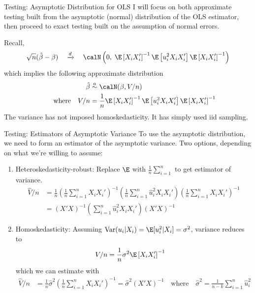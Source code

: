 \documentclass[aspectratio=169, handout]{beamer}
\newcommand{\Var}{\operatorname{Var}}
\newcommand{\dto}{\xrightarrow{d}}
\newcommand{\sumin}{\sum^n_{i=1}}
\begin{document}
\begin{frame}{Testing: Asymptotic Distribution for OLS}
I will focus on both \alert{approximate} testing built from the
\alert{asymptotic} (normal) distribution of the OLS estimator, then
proceed to \alert{exact} testing built on the \alert{assumption} of
normal errors.

Recall,
\begin{align*}
  \sqrt{n}
  (\hat{\beta}-\beta)
  \quad\dto\quad
  \calN\left(
  0
  ,\;
  \E\left[
  X_iX_i'
  \right]^{-1}
  \E
  \left[
  u_i^2
  X_iX_i'
  \right]
  \E\left[
  X_iX_i'
  \right]^{-1}
  \right)
\end{align*}
which implies the following approximate distribution
\begin{align*}
  \hat{\beta}
  &\overset{a}{\sim}
  \calN(\beta,V/n)
  \\
  \qquad\text{where}\quad
  V/n
  &=
  \frac{1}{n}
  \E\left[
  X_iX_i'
  \right]^{-1}
  \E
  \left[
  u_i^2
  X_iX_i'
  \right]
  \E\left[
  X_iX_i'
  \right]^{-1}
\end{align*}
The variance has \alert{not} imposed homoskedasticity.
It has simply used iid sampling.
\end{frame}


{\footnotesize
\begin{frame}{Testing: Estimators of Asymptotic Variance}
To use the asymptotic distribution, we need to form an \alert{estimator}
of the asymptotic variance.
Two options, depending on what we're willing to assume:
\begin{enumerate}
  \item \alert{Heteroskedasticity-robust}:
    Replace $\E$ with $\frac{1}{n}\sumin$ to get estimator of variance.
    \begin{align*}
      \widehat{V}/n
      &=
      \frac{1}{n}
      \left(
      \frac{1}{n}
      \sumin X_iX_i'
      \right)^{-1}
      \left(
      \frac{1}{n}
      \sumin \hat{u}_i^2
      X_iX_i'
      \right)
      \left(
      \frac{1}{n}
      \sumin
      X_iX_i'
      \right)^{-1}
      \\
      &=
      \left(
      X'X
      \right)^{-1}
      \left(
      \sumin \hat{u}_i^2 X_iX_i'
      \right)
      \left(
      X'X
      \right)^{-1}
    \end{align*}
  \item \alert{Homoskedasticity}:
    Assuming $\Var(u_i|X_i)=\E[u_i^2|X_i]=\sigma^2$,
    variance reduces to
    \begin{align*}
      V/n
      &=
      \frac{1}{n}
      \sigma^2
      \E\left[
      X_iX_i'
      \right]^{-1}
    \end{align*}
    which we can estimate with
    \begin{align*}
      \widehat{V}/n
      &=
      \frac{1}{n}
      \hat{\sigma}^2
      \left(
      \frac{1}{n}
      \sumin
      X_iX_i'
      \right)^{-1}
      =
      \hat{\sigma}^2
      (X'X)^{-1}
      \quad\text{where}\quad
      \hat{\sigma}^2
      =
      \frac{1}{n-k}
      \sumin \hat{u}_i^2
    \end{align*}
\end{enumerate}
\end{frame}
}
\end{document}

